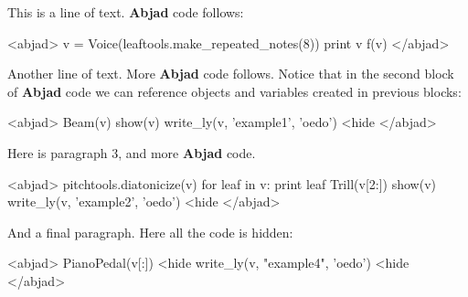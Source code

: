 \documentclass[11pt]{article}
\begin{document}
This is a line of text. \textbf{Abjad} code follows:

<abjad>
v = Voice(leaftools.make_repeated_notes(8))
print v
f(v)
</abjad>

Another line of text. More \textbf{Abjad} code follows. Notice that in the second block of \textbf{Abjad} code we can reference objects and variables created in previous blocks:

<abjad>
Beam(v)
show(v)
write_ly(v, 'example1', 'oedo') <hide
</abjad>

Here is paragraph 3, and more \textbf{Abjad} code.

<abjad>
pitchtools.diatonicize(v)
for leaf in v: print leaf
Trill(v[2:])
show(v)
write_ly(v, 'example2', 'oedo') <hide
</abjad>

And a final paragraph. Here all the code is hidden:

<abjad>
PianoPedal(v[:]) <hide
write_ly(v, "example4", 'oedo') <hide
</abjad>
\end{document}
